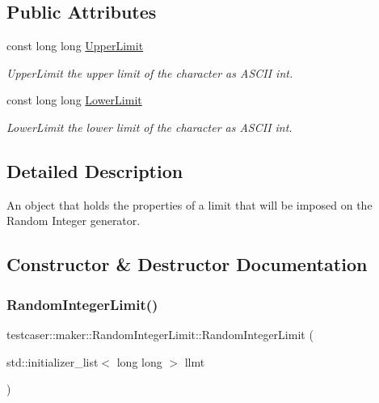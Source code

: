 \subsection*{Public Attributes}
\begin{DoxyCompactItemize}
\item 
const long long \mbox{\hyperlink{classtestcaser_1_1maker_1_1RandomIntegerLimit_a993debb42b11e472b19bcb2f2f5f2110}{Upper\+Limit}}
\begin{DoxyCompactList}\small\item\em Upper\+Limit the upper limit of the character as A\+S\+C\+II int. \end{DoxyCompactList}\item 
const long long \mbox{\hyperlink{classtestcaser_1_1maker_1_1RandomIntegerLimit_ad564182c528cdc7a96443c4a4febe1c1}{Lower\+Limit}}
\begin{DoxyCompactList}\small\item\em Lower\+Limit the lower limit of the character as A\+S\+C\+II int. \end{DoxyCompactList}\end{DoxyCompactItemize}


\subsection{Detailed Description}
An object that holds the properties of a limit that will be imposed on the Random Integer generator. 



\subsection{Constructor \& Destructor Documentation}
\mbox{\label{classtestcaser_1_1maker_1_1RandomIntegerLimit_ae70b7c715a632c4a079a0c37452decbf}} 
\subsubsection{\texorpdfstring{RandomIntegerLimit()}{RandomIntegerLimit()}\hspace{0.1cm}{\footnotesize\ttfamily [1/2]}}
{\footnotesize\ttfamily testcaser\+::maker\+::\+Random\+Integer\+Limit\+::\+Random\+Integer\+Limit (\begin{DoxyParamCaption}\item[{std\+::initializer\+\_\+list$<$ long long $>$}]{llmt }\end{DoxyParamCaption})\hspace{0.3cm}{\ttfamily [inline]}}



